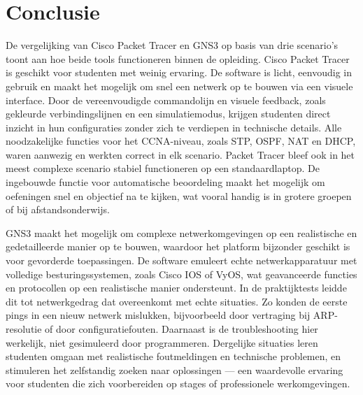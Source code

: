 
\chapter{Conclusie}%
\label{ch:conclusie}





De vergelijking van Cisco Packet Tracer en GNS3 op basis van drie scenario’s toont aan hoe beide tools functioneren binnen de opleiding. Cisco Packet Tracer is geschikt voor studenten met weinig ervaring. De software is licht, eenvoudig in gebruik en maakt het mogelijk om snel een netwerk op te bouwen via een visuele interface. Door de vereenvoudigde commandolijn en visuele feedback, zoals gekleurde verbindingslijnen en een simulatiemodus, krijgen studenten direct inzicht in hun configuraties zonder zich te verdiepen in technische details. Alle noodzakelijke functies voor het CCNA-niveau, zoals STP, OSPF, NAT en DHCP, waren aanwezig en werkten correct in elk scenario. Packet Tracer bleef ook in het meest complexe scenario stabiel functioneren op een standaardlaptop. De ingebouwde functie voor automatische beoordeling maakt het mogelijk om oefeningen snel en objectief na te kijken, wat vooral handig is in grotere groepen of bij afstandsonderwijs.

\vspace{0.3cm}

GNS3 maakt het mogelijk om complexe netwerkomgevingen op een realistische en gedetailleerde manier op te bouwen, waardoor het platform bijzonder geschikt is voor gevorderde toepassingen. De software emuleert echte netwerkapparatuur met volledige besturingssystemen, zoals Cisco IOS of VyOS, wat geavanceerde functies en protocollen op een realistische manier ondersteunt. In de praktijktests leidde dit tot netwerkgedrag dat overeenkomt met echte situaties. Zo konden de eerste pings in een nieuw netwerk mislukken, bijvoorbeeld door vertraging bij ARP-resolutie of door configuratiefouten. Daarnaast is de troubleshooting hier werkelijk, niet gesimuleerd door programmeren. Dergelijke situaties leren studenten omgaan met realistische foutmeldingen en technische problemen, en stimuleren het zelfstandig zoeken naar oplossingen — een waardevolle ervaring voor studenten die zich voorbereiden op stages of professionele werkomgevingen.

